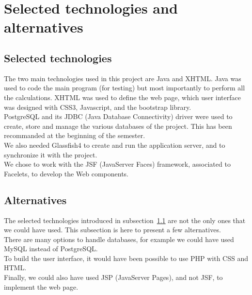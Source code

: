 \section{Selected technologies and alternatives}
\label{sec:techno}

\subsection{Selected technologies}
\label{ssec:select}

The two main technologies used in this project are Java and XHTML. Java was used to code the main program (for testing) but most importantly to perform all the calculations. XHTML was used to define the web page, which user interface was designed with CSS3, Javascript, and the bootstrap library.\\

PostgreSQL and its JDBC (Java Database Connectivity) driver were used to create, store and manage the various databases of the project. This has been recommanded at the beginning of the semester.\\

We also needed Glassfish4 to create and run the application server, and to synchronize it with the project.\\

We chose to work with the JSF (JavaServer Faces)
framework, associated to Facelets, to develop the Web components.


\subsection{Alternatives}
\label{ssec:alter}

The selected technologies introduced in {\sc subsection}~\ref{ssec:select} are not the only ones that we could have used. This subsection is here to present a few alternatives.\\

There are many options to handle databases, for example we could have used MySQL instead of PostgreSQL.\\

To build the user interface, it would have been possible to use PHP with CSS and HTML.\\

Finally, we could also have used JSP (JavaServer Pages), and not JSF, to implement the web page.

